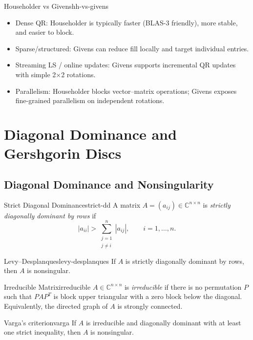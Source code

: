 \documentclass[../../main.tex]{subfiles}
\begin{document}
\begin{remark}{Householder vs Givens}{hh-vs-givens}
    \begin{itemize}
        \item Dense QR: Householder is typically faster (BLAS-3 friendly), more stable, and easier to block.
        \item Sparse/structured: Givens can reduce fill locally and target individual entries.
        \item Streaming LS / online updates: Givens supports incremental QR updates with simple 2×2 rotations.
        \item Parallelism: Householder blocks vector–matrix operations; Givens exposes fine-grained parallelism on independent rotations.
    \end{itemize}
\end{remark}

\section{Diagonal Dominance and Gershgorin Discs}
\label{sec:gershgorin}

\subsection{Diagonal Dominance and Nonsingularity}
\begin{definition}{Strict Diagonal Dominance}{strict-dd}
    A matrix $A=(a_{ij})\in\mathbb{C}^{n\times n}$ is \emph{strictly diagonally dominant by rows} if
    \[
        |a_{ii}| > \sum_{\substack{j=1\\ j\ne i}}^n |a_{ij}|,\qquad i=1,\dots,n.
    \]
\end{definition}

\begin{theorem}{Levy--Desplanques}{levy-desplanques}
    If $A$ is strictly diagonally dominant by rows, then $A$ is nonsingular.
\end{theorem}

\begin{definition}{Irreducible Matrix}{irreducible}
    $A\in\mathbb{C}^{n\times n}$ is \emph{irreducible} if there is no permutation $P$ such that $PAP^T$ is block upper triangular with a zero block below the diagonal. Equivalently, the directed graph of $A$ is strongly connected.
\end{definition}

\begin{theorem}{Varga's criterion}{varga}
    If $A$ is irreducible and diagonally dominant with at least one strict inequality, then $A$ is nonsingular.
\end{theorem}
\end{document}
